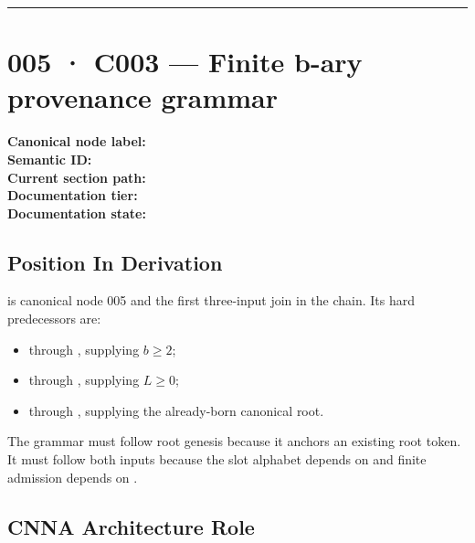 \begin{center}\rule{0.5\linewidth}{0.5pt}\end{center}

\section{005 · C003 --- Finite b-ary provenance
grammar}\label{c003-finite-b-ary-provenance-grammar}

\textbf{Canonical node label:} \texttt{\protect{}}\\
\textbf{Semantic ID:} \texttt{\protect{}}\\
\textbf{Current section path:} \texttt{\protect{}}\\
\textbf{Documentation tier:} \texttt{\protect{}}\\
\textbf{Documentation state:} \texttt{\protect{}}

\subsection{Position In Derivation}\label{position-in-derivation-1}

\texttt{\protect{}} is canonical node 005 and the first three-input join in
the chain. Its hard predecessors are:

\begin{itemize}
\tightlist
\item
  \texttt{\protect{}} through \texttt{\protect{}}, supplying \(b\ge 2\);
\item
  \texttt{\protect{}} through \texttt{\protect{}}, supplying \(L\ge 0\);
\item
  \texttt{\protect{}} through \texttt{\protect{}}, supplying the
  already-born canonical root.
\end{itemize}

The grammar must follow root genesis because it anchors an existing root
token. It must follow both inputs because the slot alphabet depends on
\texttt{\protect{}} and finite admission depends on \texttt{\protect{}}.

\subsection{CNNA Architecture Role}\label{cnna-architecture-role-2}

